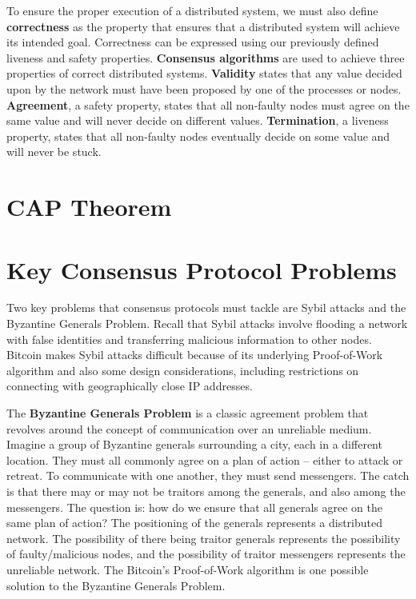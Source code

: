 \documentclass[full.tex]{subfiles}
\begin{document}
    To ensure the proper execution of a distributed system, we must also define \textbf{correctness} as the property that ensures that a distributed system will achieve its intended goal. Correctness can be expressed using our previously defined liveness and safety properties. \textbf{Consensus algorithms} are used to achieve three properties of correct distributed systems. \textbf{Validity} states that any value decided upon by the network must have been proposed by one of the processes or nodes. \textbf{Agreement}, a safety property, states that all non-faulty nodes must agree on the same value and will never decide on different values. \textbf{Termination}, a liveness property, states that all non-faulty nodes eventually decide on some value and will never be stuck.
    
    
    \section*{CAP Theorem}
    
    \section*{Key Consensus Protocol Problems}
    
    Two key problems that consensus protocols must tackle are Sybil attacks and the Byzantine Generals Problem. Recall that Sybil attacks involve flooding a network with false identities and transferring malicious information to other nodes. Bitcoin makes Sybil attacks difficult because of its underlying Proof-of-Work algorithm and also some design considerations, including restrictions on connecting with geographically close IP addresses.
    
    The \textbf{Byzantine Generals Problem} is a classic agreement problem that revolves around the concept of communication over an unreliable medium. Imagine a group of Byzantine generals surrounding a city, each in a different location. They must all commonly agree on a plan of action -- either to attack or retreat. To communicate with one another, they must send messengers. The catch is that there may or may not be traitors among the generals, and also among the messengers. The question is: how do we ensure that all generals agree on the same plan of action? The positioning of the generals represents a distributed network. The possibility of there being traitor generals represents the possibility of faulty/malicious nodes, and the possibility of traitor messengers represents the unreliable network. The Bitcoin's Proof-of-Work algorithm is one possible solution to the Byzantine Generals Problem.
    
\end{document}
